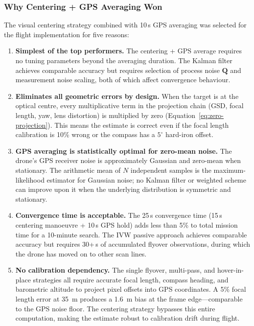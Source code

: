 \subsubsection{Why Centering + GPS Averaging Won}

The visual centering strategy combined with 10\,s GPS averaging was selected for the flight implementation for five reasons:

\begin{enumerate}
  \item \textbf{Simplest of the top performers.}  The centering + GPS average requires no tuning parameters beyond the averaging duration.  The Kalman filter achieves comparable accuracy but requires selection of process noise $\mathbf{Q}$ and measurement noise scaling, both of which affect convergence behaviour.

  \item \textbf{Eliminates all geometric errors by design.}  When the target is at the optical centre, every multiplicative term in the projection chain (GSD, focal length, yaw, lens distortion) is multiplied by zero (Equation~\ref{eq:zero-projection}).  This means the estimate is correct even if the focal length calibration is 10\% wrong or the compass has a $5^{\circ}$ hard-iron offset.

  \item \textbf{GPS averaging is statistically optimal for zero-mean noise.}  The drone's GPS receiver noise is approximately Gaussian and zero-mean when stationary.  The arithmetic mean of $N$ independent samples is the maximum-likelihood estimator for Gaussian noise; no Kalman filter or weighted scheme can improve upon it when the underlying distribution is symmetric and stationary.

  \item \textbf{Convergence time is acceptable.}  The 25\,s convergence time (15\,s centering manoeuvre + 10\,s GPS hold) adds less than 5\% to total mission time for a 10-minute search.  The IVW passive approach achieves comparable accuracy but requires 30+\,s of accumulated flyover observations, during which the drone has moved on to other scan lines.

  \item \textbf{No calibration dependency.}  The single flyover, multi-pass, and hover-in-place strategies all require accurate focal length, compass heading, and barometric altitude to project pixel offsets into GPS coordinates.  A 5\% focal length error at \SI{35}{\metre} produces a \SI{1.6}{\metre} bias at the frame edge---comparable to the GPS noise floor.  The centering strategy bypasses this entire computation, making the estimate robust to calibration drift during flight.
\end{enumerate}

